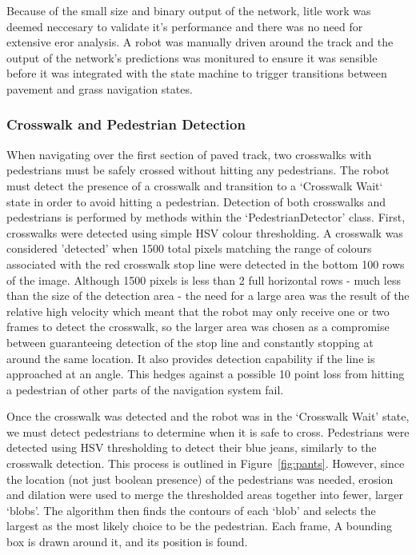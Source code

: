 \documentclass[titlepage, twocolumn]{article}
\begin{document}
            Because of the small size and binary output of the network, litle work was deemed neccesary to validate it's performance and there was no need for extensive eror analysis. A robot was manually driven around the track and the output of the network's predictions was monitured to ensure it was sensible before it was integrated with the state machine to trigger transitions between pavement and grass navigation states.

        \subsubsection{Crosswalk and Pedestrian Detection}
            When navigating over the first section of paved track, two crosswalks with pedestrians must be safely crossed without hitting any pedestrians. The robot must detect the presence of a crosswalk and transition to a `Crosswalk Wait` state in order to avoid hitting a pedestrian. Detection of both crosswalks and pedestrians is performed by methods within the `PedestrianDetector' class. First, crosswalks were detected using simple HSV colour thresholding. A crosswalk was considered 'detected' when 1500 total pixels matching the range of colours associated with the red crosswalk stop line were detected in the bottom 100 rows of the image. Although 1500 pixels is less than 2 full horizontal rows - much less than the size of the detection area - the need for a large area was the result of the relative high velocity which meant that the robot may only receive one or two frames to detect the crosswalk, so the larger area was chosen as a compromise between guaranteeing detection of the stop line and constantly stopping at around the same location. It also provides detection capability if the line is approached at an angle. This hedges against a possible 10 point loss from hitting a pedestrian of other parts of the navigation system fail.

            Once the crosswalk was detected and the robot was in the `Crosswalk Wait' state, we must detect pedestrians to determine when it is safe to cross. Pedestrians were detected using HSV thresholding to detect their blue jeans, similarly to the crosswalk detection. This process is outlined in Figure~\ref{fig:pants}. However, since the location (not just boolean presence) of the pedestrians was needed, erosion and dilation were used to merge the thresholded areas together into fewer, larger `blobs'. The algorithm then finds the contours of each `blob' and selects the largest as the most likely choice to be the pedestrian. Each frame, A bounding box is drawn around it, and its position is found.
\end{document}
